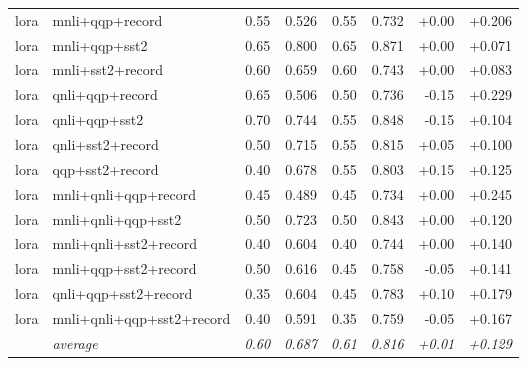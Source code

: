 \begin{table}[t]
\begin{tabular}{llrrrrrr}
    lora & mnli+qqp+record & 0.55 & 0.526 & 0.55 & 0.732 & +0.00 & +0.206 \\
    lora & mnli+qqp+sst2 & 0.65 & 0.800 & 0.65 & 0.871 & +0.00 & +0.071 \\
    lora & mnli+sst2+record & 0.60 & 0.659 & 0.60 & 0.743 & +0.00 & +0.083 \\
    lora & qnli+qqp+record & 0.65 & 0.506 & 0.50 & 0.736 & -0.15 & +0.229 \\
    lora & qnli+qqp+sst2 & 0.70 & 0.744 & 0.55 & 0.848 & -0.15 & +0.104 \\
    lora & qnli+sst2+record & 0.50 & 0.715 & 0.55 & 0.815 & +0.05 & +0.100 \\
    lora & qqp+sst2+record & 0.40 & 0.678 & 0.55 & 0.803 & +0.15 & +0.125 \\
    lora & mnli+qnli+qqp+record & 0.45 & 0.489 & 0.45 & 0.734 & +0.00 & +0.245 \\
    lora & mnli+qnli+qqp+sst2 & 0.50 & 0.723 & 0.50 & 0.843 & +0.00 & +0.120 \\
    lora & mnli+qnli+sst2+record & 0.40 & 0.604 & 0.40 & 0.744 & +0.00 & +0.140 \\
    lora & mnli+qqp+sst2+record & 0.50 & 0.616 & 0.45 & 0.758 & -0.05 & +0.141 \\
    lora & qnli+qqp+sst2+record & 0.35 & 0.604 & 0.45 & 0.783 & +0.10 & +0.179 \\
    lora & mnli+qnli+qqp+sst2+record & 0.40 & 0.591 & 0.35 & 0.759 & -0.05 & +0.167 \\
    \addlinespace
    & \textit{average} & \textit{0.60} & \textit{0.687} & \textit{0.61} & \textit{0.816} & \textit{+0.01} & \textit{+0.129} \\
    \bottomrule
  \end{tabular}
\end{table}
